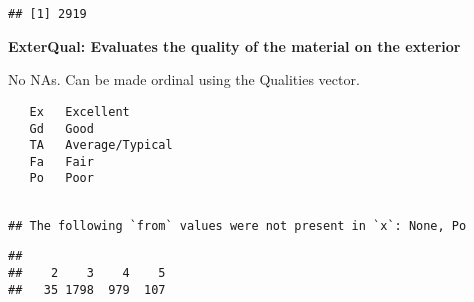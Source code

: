\documentclass[]{article}
\newenvironment{Shaded}{\begin{snugshade}}{\end{snugshade}}
\newcommand{\KeywordTok}[1]{\textcolor[rgb]{0.13,0.29,0.53}{\textbf{#1}}}
\newcommand{\NormalTok}[1]{#1}
\newcommand{\OperatorTok}[1]{\textcolor[rgb]{0.81,0.36,0.00}{\textbf{#1}}}
\begin{document}
\begin{Shaded}
\end{Shaded}

\begin{verbatim}
## [1] 2919
\end{verbatim}

\textbf{ExterQual: Evaluates the quality of the material on the
exterior}

No NAs. Can be made ordinal using the Qualities vector.

\begin{verbatim}
   Ex   Excellent
   Gd   Good
   TA   Average/Typical
   Fa   Fair
   Po   Poor
   
\end{verbatim}

\begin{Shaded}
\end{Shaded}

\begin{verbatim}
## The following `from` values were not present in `x`: None, Po
\end{verbatim}

\begin{Shaded}
\end{Shaded}

\begin{verbatim}
## 
##    2    3    4    5 
##   35 1798  979  107
\end{verbatim}

\begin{Shaded}
\end{Shaded}
\end{document}

